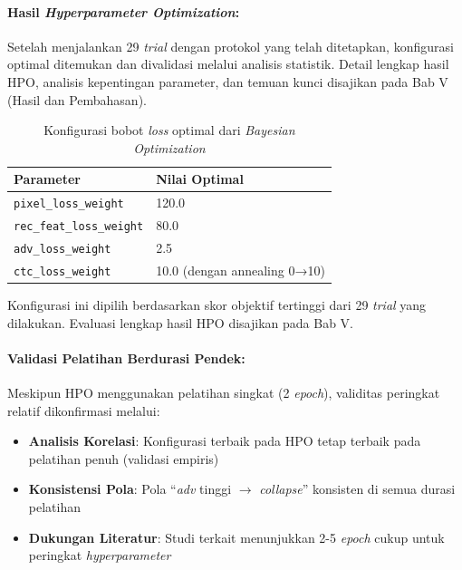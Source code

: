 \documentclass[12pt,a4paper]{article}
\begin{document}
\paragraph{Hasil \textit{Hyperparameter Optimization}:}

Setelah menjalankan 29 \textit{trial} dengan protokol yang telah ditetapkan, konfigurasi optimal ditemukan dan divalidasi melalui analisis statistik. Detail lengkap hasil HPO, analisis kepentingan parameter, dan temuan kunci disajikan pada Bab V (Hasil dan Pembahasan).

\begin{table}[H]
\centering
\caption{Konfigurasi bobot \textit{loss} optimal dari \textit{Bayesian Optimization}}
\label{tab:hpo-best-config}
\small
\begin{tabular}{|l|l|}
\hline
\textbf{Parameter} & \textbf{Nilai Optimal} \\ \hline
\texttt{pixel\_loss\_weight} & 120.0 \\ \hline
\texttt{rec\_feat\_loss\_weight} & 80.0 \\ \hline
\texttt{adv\_loss\_weight} & 2.5 \\ \hline
\texttt{ctc\_loss\_weight} & 10.0 (dengan annealing 0→10) \\ \hline
\end{tabular}
\end{table}

Konfigurasi ini dipilih berdasarkan skor objektif tertinggi dari 29 \textit{trial} yang dilakukan. Evaluasi lengkap hasil HPO disajikan pada Bab V.

\paragraph{Validasi Pelatihan Berdurasi Pendek:}

Meskipun HPO menggunakan pelatihan singkat (2 \textit{epoch}), validitas peringkat relatif dikonfirmasi melalui:

\begin{itemize}[leftmargin=*, nosep]
\item \textbf{Analisis Korelasi}: Konfigurasi terbaik pada HPO tetap terbaik pada pelatihan penuh (validasi empiris)
\item \textbf{Konsistensi Pola}: Pola ``\textit{adv} tinggi $\rightarrow$ \textit{collapse}'' konsisten di semua durasi pelatihan
\item \textbf{Dukungan Literatur}: Studi terkait menunjukkan 2-5 \textit{epoch} cukup untuk peringkat \textit{hyperparameter}
\end{itemize}
\end{document}
